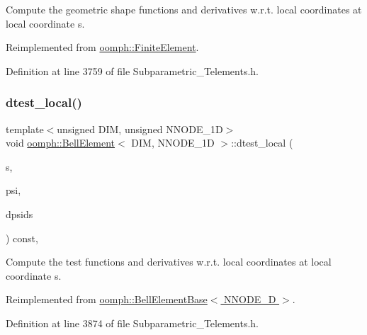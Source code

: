 Compute the geometric shape functions and derivatives w.\+r.\+t. local coordinates at local coordinate s. 



Reimplemented from \hyperlink{classoomph_1_1FiniteElement_a9db1456b827131c21a991ac9fedf4b0c}{oomph\+::\+Finite\+Element}.



Definition at line 3759 of file Subparametric\+\_\+\+Telements.\+h.

\mbox{\label{classoomph_1_1BellElement_ae0b6d4d44df8a05a9dd1b8709c9f0247}} 
\subsubsection{\texorpdfstring{dtest\+\_\+local()}{dtest\_local()}}
{\footnotesize\ttfamily template$<$unsigned D\+IM, unsigned N\+N\+O\+D\+E\+\_\+1D$>$ \\
void \hyperlink{classoomph_1_1BellElement}{oomph\+::\+Bell\+Element}$<$ D\+IM, N\+N\+O\+D\+E\+\_\+1D $>$\+::dtest\+\_\+local (\begin{DoxyParamCaption}\item[{const \hyperlink{classoomph_1_1Vector}{Vector}$<$ double $>$ \&}]{s,  }\item[{\hyperlink{classoomph_1_1Shape}{Shape} \&}]{psi,  }\item[{\hyperlink{classoomph_1_1DShape}{D\+Shape} \&}]{dpsids }\end{DoxyParamCaption}) const\hspace{0.3cm}{\ttfamily [inline]}, {\ttfamily [virtual]}}



Compute the test functions and derivatives w.\+r.\+t. local coordinates at local coordinate s. 



Reimplemented from \hyperlink{classoomph_1_1BellElementBase_aab180be9cd6347005c5505bedf673db2}{oomph\+::\+Bell\+Element\+Base$<$ N\+N\+O\+D\+E\+\_\+D $>$}.



Definition at line 3874 of file Subparametric\+\_\+\+Telements.\+h.

\mbox{\label{classoomph_1_1BellElement_a60d06c5a989f698d550368e30760c004}} 
